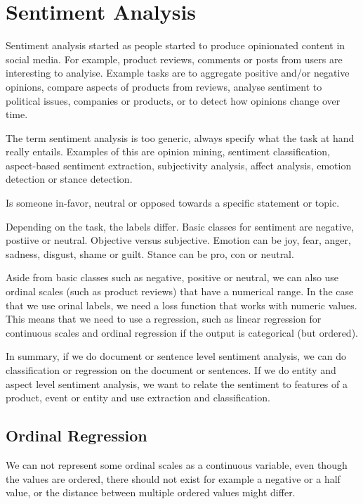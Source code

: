 \section{Sentiment Analysis}

Sentiment analysis started as people started to produce opinionated
content in social media. For example, product reviews, comments or
posts from users are interesting to analyise. Example tasks are to
aggregate positive and/or negative opinions, compare aspects of products
from reviews, analyse sentiment to political issues, companies or products, or
to detect how opinions change over time.

The term sentiment analysis is too generic, always specify what the task at
hand really entails. Examples of this are opinion mining, sentiment
classification,
aspect-based sentiment extraction, subjectivity analysis, affect
analysis, emotion detection or
stance detection.

\begin{definition}
  Is someone in-favor, neutral or opposed towards a specific
  statement or topic.
\end{definition}

Depending on the task, the labels differ. Basic classes for sentiment
are negative,
postiive or neutral. Objective versus subjective. Emotion can be joy,
fear, anger, sadness,
disgust, shame or guilt. Stance can be pro, con or neutral.

Aside from basic classes such as negative, positive or neutral, we can
also use ordinal scales (such as product reviews) that have a numerical
range. In the case that we use orinal labels, we need a loss function
that works with numeric values. This means that we need to use a regression,
such as linear regression for continuous scales and ordinal regression if the
output is categorical (but ordered).

In summary, if we do document or sentence level sentiment analysis, we can
do classification or regression on the document or sentences. If we do entity
and aspect level sentiment analysis, we want to relate the sentiment to features
of a product, event or entity and use extraction and classification.

\subsection{Ordinal Regression}

We can not represent some ordinal scales as a continuous variable, even though
the values are ordered, there should not exist for example a negative or a half
value, or the distance between multiple ordered values might differ.


